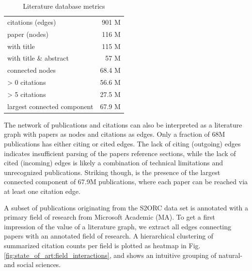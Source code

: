 \begin{table}[ht]
	\centering
	\caption[Literature Graph Metrics]{Literature database metrics}
	\label{tab:state_of_art:graph}
	\begin{tabular}{l|r}
		\hline
		citations (edges)           & 901 M 	\\
		paper (nodes)               & 116 M 	\\ \hline
		with title					& 115 M		\\
		with title \& abstract		&  57 M		\\ \hline
		connected nodes             &  68.4 M 	\\
		> 0 citations				&  56.6 M	\\
		> 5 citations				&  27.5 M	\\
		largest connected component &  67.9 M 	\\ \hline
	\end{tabular}
\end{table}

The network of publications and citations can also be interpreted as a literature graph with papers as nodes and citations as edges.
Only a fraction of 68M publications has either citing or cited edges.
The lack of citing (outgoing) edges indicates insufficient parsing of the papers reference sections, while the lack of cited (incoming) edges is likely a combination of technical limitations and unrecognized publications.
Striking though, is the presence of the largest connected component of 67.9M publications, where each paper can be reached via at least one citation edge.

A subset of publications originating from the S2ORC data set is annotated with a primary field of research from Microsoft Academic (MA). 
To get a first impression of the value of a literature graph, we extract all edges connecting papers with an annotated field of research.
A hierarchical clustering of summarized citation counts per field is plotted as heatmap in Fig. \ref{fig:state_of_art:field_interactions}, and shows an intuitive grouping of natural- and social sciences.

